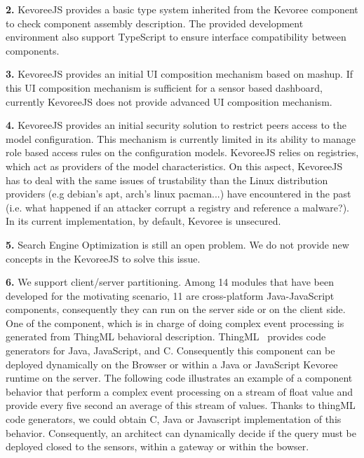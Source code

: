 \indent \textbf{2.} KevoreeJS provides a basic type system inherited from the Kevoree component to check component assembly description. The provided development environment also support TypeScript to ensure interface compatibility between components.

\indent \textbf{3.} KevoreeJS provides an initial UI composition mechanism based on mashup. If this UI composition mechanism is sufficient for a sensor based dashboard, currently KevoreeJS does not provide advanced UI composition mechanism.

\indent \textbf{4.} KevoreeJS provides an initial security solution to restrict peers access to the model configuration. This mechanism is currently limited in its ability to manage role based access rules on the configuration models. KevoreeJS relies on registries, which act as providers of the model characteristics. On this aspect, KevoreeJS has to deal with the same issues of trustability than the Linux distribution providers (e.g debian's apt, arch's linux pacman...) have encountered in the past (i.e. what happened if an attacker corrupt a registry and reference a malware?).  In its current implementation, by default, Kevoree is unsecured.

\indent \textbf{5.} Search Engine Optimization is still an open problem. We do not provide new concepts in the KevoreeJS to solve this issue.

\indent \textbf{6.} We support client/server partitioning. Among 14 modules that have been developed for the motivating scenario, 11 are cross-platform Java-JavaScript components, consequently they can run on the server side or on the client side.  One of the component, which is in charge of doing complex event processing is generated from ThingML behavioral description. ThingML~\cite{DBLP:conf/models/FleureyMSB11} provides code generators for Java, JavaScript, and C. Consequently this component can be deployed dynamically on the Browser or within a Java or JavaScript Kevoree runtime on the server.  The following code illustrates an example of a component behavior that perform a complex event processing on a stream of float value and provide every five second an average of this stream of values. Thanks to thingML code generators, we could obtain C, Java or Javascript implementation of this behavior. Consequently, an architect can dynamically decide if the query must be deployed closed to the sensors, within a gateway or within the bowser. 


